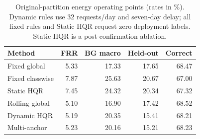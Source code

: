 \begin{table}[tbp]
\caption{Original-partition energy operating points (rates in \%). Dynamic rules use 32 requests/day and seven-day delay; all fixed rules and Static HQR request zero deployment labels. Static HQR is a post-confirmation ablation.}\label{tab:revision-primary}
\centering\small\setlength{\tabcolsep}{4pt}
\begin{tabular}{lrrrr}
\toprule
Method & FRR & BG macro & Held-out & Correct\\\midrule
Fixed global & 5.33 & 17.33 & 17.65 & 68.47\\
Fixed classwise & 7.87 & 25.63 & 20.67 & 67.00\\
Static HQR & 7.45 & 24.32 & 20.34 & 67.32\\
Rolling global & 5.10 & 16.90 & 17.42 & 68.52\\
Dynamic HQR & 5.19 & 20.35 & 15.41 & 68.21\\
Multi-anchor & 5.23 & 20.16 & 15.21 & 68.23\\
\bottomrule\end{tabular}\end{table}
